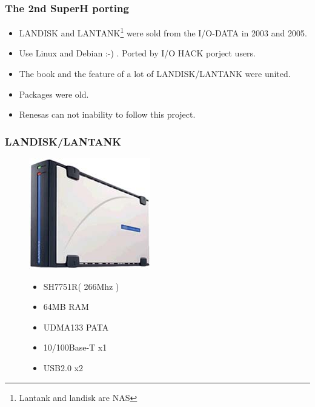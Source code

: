 \documentclass[cjk,dvipdfm,12pt]{beamer}
\begin{document}
\begin{frame}
 \frametitle{The 2nd SuperH porting}
  \begin{itemize}
    \item LANDISK and LANTANK\footnote{Lantank and landisk are NAS} were sold from the I/O-DATA in 2003 and 2005.
    \item Use Linux and Debian :-) . Ported by I/O HACK porject users.
    \item The book and the feature of a lot of LANDISK/LANTANK were united. 
    \item Packages were old.
    \item Renesas can not inability to follow this project.
  \end{itemize}
\end{frame}


\begin{frame}
 \frametitle{LANDISK/LANTANK}

\begin{figure}
 \begin{minipage}[t]{0.6\hsize}
   \includegraphics[width=0.5\hsize]{image200705/landisk00.jpg}
 \end{minipage}
 \begin{minipage}[t]{0.5\hsize}
  \begin{itemize}
   \item SH7751R( 266Mhz )
   \item 64MB RAM
   \item UDMA133 PATA 
   \item 10/100Base-T x1
   \item USB2.0 x2 
  \end{itemize}
 \end{minipage}
\end{figure}
\end{frame}
\end{document}
